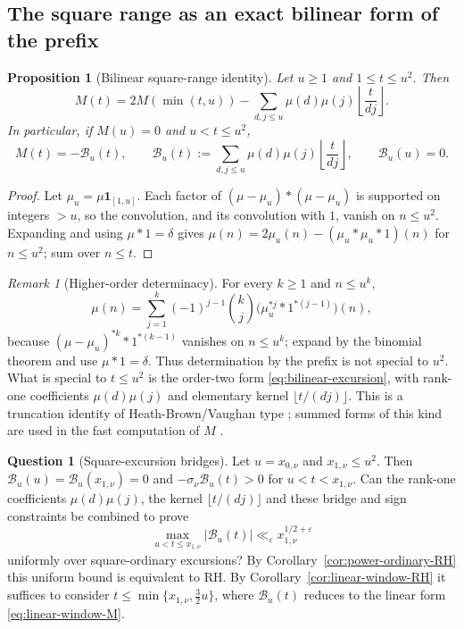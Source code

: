 \documentclass[11pt]{amsart}
\numberwithin{equation}{section}
\theoremstyle{plain}
\newtheorem{proposition}[theorem]{Proposition}
\theoremstyle{definition}
\newtheorem{question}[theorem]{Question}
\theoremstyle{remark}
\newtheorem{remark}[theorem]{Remark}
\newcommand{\eps}{\varepsilon}
\begin{document}
\subsection{The square range as an exact bilinear form of the prefix}

\begin{proposition}[Bilinear square-range identity]
\label{prop:prefix-bilinear}
Let $u\ge1$ and $1\le t\le u^2$. Then
\begin{equation}
\label{eq:bilinear-general}
M(t)=2M(\min(t,u))-
\sum_{d,j\le u}\mu(d)\mu(j)\left\lfloor\frac{t}{dj}\right\rfloor.
\end{equation}
In particular, if $M(u)=0$ and $u<t\le u^2$,
\begin{equation}
\label{eq:bilinear-excursion}
M(t)=-\mathcal B_u(t),\qquad
\mathcal B_u(t):=\sum_{d,j\le u}\mu(d)\mu(j)
\left\lfloor\frac{t}{dj}\right\rfloor,
\qquad \mathcal B_u(u)=0.
\end{equation}
\end{proposition}

\begin{proof}
Let $\mu_u=\mu\mathbf1_{[1,u]}$. Each factor of $(\mu-\mu_u)*(\mu-\mu_u)$ is
supported on integers $>u$, so the convolution, and its convolution with
$1$, vanish on $n\le u^2$. Expanding and using $\mu*1=\delta$ gives
$\mu(n)=2\mu_u(n)-(\mu_u*\mu_u*1)(n)$ for $n\le u^2$; sum over $n\le t$.
\end{proof}

\begin{remark}[Higher-order determinacy]
\label{rem:prefix-k}
For every $k\ge1$ and $n\le u^k$,
\begin{equation}
\label{eq:HB-k}
\mu(n)=\sum_{j=1}^{k}(-1)^{j-1}\binom{k}{j}
\bigl(\mu_u^{*j}*1^{*(j-1)}\bigr)(n),
\end{equation}
because $(\mu-\mu_u)^{*k}*1^{*(k-1)}$ vanishes on $n\le u^k$; expand by the
binomial theorem and use $\mu*1=\delta$. Thus determination by the prefix
is not special to $u^2$. What is special to $t\le u^2$ is the order-two form
\eqref{eq:bilinear-excursion}, with rank-one coefficients $\mu(d)\mu(j)$ and
elementary kernel $\lfloor t/(dj)\rfloor$. This is a truncation identity of
Heath-Brown/Vaughan type \cite{HB82}; summed forms of this kind are used in
the fast computation of $M$ \cite{HT23}.
\end{remark}

\begin{question}[Square-excursion bridges]
\label{q:excursion-constraint}
Let $u=x_{0,\nu}$ and $x_{1,\nu}\le u^2$. Then
$\mathcal B_u(u)=\mathcal B_u(x_{1,\nu})=0$ and
$-\sigma_\nu\mathcal B_u(t)>0$ for $u<t<x_{1,\nu}$. Can the rank-one
coefficients $\mu(d)\mu(j)$, the kernel $\lfloor t/(dj)\rfloor$ and these
bridge and sign constraints be combined to prove
\[
\max_{u<t\le x_{1,\nu}}|\mathcal B_u(t)|
\ll_\eps x_{1,\nu}^{1/2+\eps}
\]
uniformly over square-ordinary excursions? By
Corollary~\ref{cor:power-ordinary-RH} this uniform bound is equivalent to
RH. By Corollary~\ref{cor:linear-window-RH} it suffices to consider
$t\le\min\{x_{1,\nu},\frac32u\}$, where $\mathcal B_u(t)$ reduces to the
linear form \eqref{eq:linear-window-M}.
\end{question}
\end{document}
